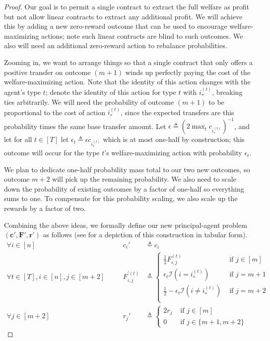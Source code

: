 \documentclass{article}
\newcommand{\indicator}[1]{\mathcal{I}\left(#1\right)}
\newcommand{\costvector}{\bm{c}}
\newcommand{\Cost}[1]{c_{#1}}
\newcommand{\TypedForecast}[3]{F^{(#1)}_{#2, #3}}
\newcommand{\ForecastTensor}{\bm{F}}
\newcommand{\rewardvector}{\bm{r}}
\newcommand{\Reward}[1]{r_{#1}}
\newcommand{\PrincipalAgentProblemPrime}{\left(\costvector', \ForecastTensor', \rewardvector'\right)}
\newcommand{\OptimalAction}{i_*}
\newcommand{\TypedOptimalAction}[1]{\OptimalAction^{(#1)}}
\newcommand{\forecastprime}[3]{F^{\prime(#1)}_{#2, #3}}
\begin{document}
\begin{proof}
  Our goal is to permit a single contract to extract the full welfare as profit but not allow linear contracts to extract any additional profit. We will achieve this by adding a new zero-reward outcome that can be used to encourage welfare-maximizing actions; note such linear contracts are blind to such outcomes. We also will need an additional zero-reward action to rebalance probabilities.

  Zooming in, we want to arrange things so that a single contract that only offers a positive transfer on outcome $(m + 1)$ winds up perfectly paying the cost of the welfare-maximizing action. Note that the identity of this action changes with the agent's type $t$; denote the identity of this action for type $t$ with $\TypedOptimalAction{t}$, breaking ties arbitrarily. We will need the probability of outcome $(m + 1)$ to be proportional to the cost of action $\TypedOptimalAction{t}$, since the expected transfers are this probability times the same base transfer amount. Let $\epsilon \triangleq (2 \max_t \Cost{\TypedOptimalAction{t}})^{-1}$, and let for all $t \in [T]$ let $\epsilon_t \triangleq \epsilon \Cost{\TypedOptimalAction{t}}$ which is at most one-half by construction; this outcome will occur for the type $t$'s welfare-maximizing action with probability $\epsilon_t$.
  
  We plan to dedicate one-half probability mass total to our two new outcomes, so outcome $m + 2$ will pick up the remaining probability. We also need to scale down the probability of existing outcomes by a factor of one-half so everything sums to one. To compensate for this probability scaling, we also scale up the rewards by a factor of two.
  
  Combining the above ideas, we formally define our new principal-agent problem $\PrincipalAgentProblemPrime$ as follows (see  for a depiction of this construction in tabular form).
  \begin{alignat*}
    \forall i \in [n] \quad
    &&\Cost{i}' &\triangleq \Cost{i} \\
    \forall t \in [T], i \in [n], j \in [m+2] \quad
    &&\forecastprime{t}{i}{j} &\triangleq \begin{cases}
      \tfrac12 \TypedForecast{t}{i}{j}                                  & \text{ if } j \in [m] \\
      \epsilon_t \indicator{i = \TypedOptimalAction{t}}                 & \text{ if } j = m + 1 \\
      \tfrac12 - \epsilon_t \indicator{i \not = \TypedOptimalAction{t}} & \text{ if } j = m + 2 \\
    \end{cases} \\
    \forall j \in [m+2] \quad
    &&\Reward{j}' &\triangleq \begin{cases}
      2 \Reward{j} & \text{ if } j \in [m] \\
      0            & \text{ if } j \in \{m+1, m+2\}
    \end{cases}
  \end{alignat*}
  

\end{proof}
\end{document}
